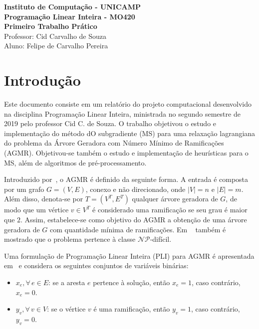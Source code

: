 \documentclass[12pt, a4paper]{article}
\theoremstyle{plain}
\theoremstyle{definition}
\theoremstyle{remark}
\begin{document}

\begin{center}
    {\normalsize\textbf{Instituto de Computação -  UNICAMP}}\\
    {\normalsize\textbf{Programação Linear Inteira - MO420}}\\
    {\normalsize\textbf{Primeiro Trabalho Prático}}
    \\ \bigskip
    {\normalsize Professor: Cid Carvalho de Souza}\\
    {\normalsize Aluno: Felipe de Carvalho Pereira}
\end{center}

\section{Introdução}

Este documento consiste em um relatório do projeto computacional desenvolvido na disciplina Programação Linear Inteira, ministrada no segundo semestre de 2019 pelo professor Cid C. de Souza. O trabalho objetivou o estudo e implementação do método dO subgradiente (MS) para uma relaxação lagrangiana do problema da Árvore Geradora com Número Mínimo de Ramificações (AGMR). Objetivou-se também o estudo e implementação de heurísticas para o MS, além de algoritmos de pré-processamento.

Introduzido por~\cite{Gargano2002}, o AGMR é definido da seguinte forma. A entrada é composta por um grafo $G = (V, E)$, conexo e não direcionado, onde $|V| = n$ e $|E| = m$. Além disso, denota-se por $T = (V^T, E^T)$ qualquer árvore geradora de $G$, de modo que um vértice $v \in V^T$ é considerado uma ramificação se seu grau é maior que $2$. Assim, estabelece-se como objetivo do AGMR a obtenção de uma árvore geradora de $G$ com quantidade mínima de ramificações. Em ~\cite{Gargano2002} também é mostrado que o problema pertence à classe $\mathcal{NP}$-difícil.

Uma formulação de Programação Linear Inteira (PLI) para AGMR é apresentada em~\cite{Carrabs2013} e considera os seguintes conjuntos de variáveis binárias:

\begin{itemize}[before=\vspace{\baselineskip},after=\vspace{\baselineskip}]

\item $x_e, \forall \, e \in E$: se a aresta $e$ pertence à solução, então $x_e = 1$, caso contrário, $x_e = 0$.
\item $y_v, \forall \, v \in V$: se o vértice $v$ é uma ramificação, então $y_v = 1$, caso contrário, $y_v = 0$.

\end{itemize}
\end{document}
